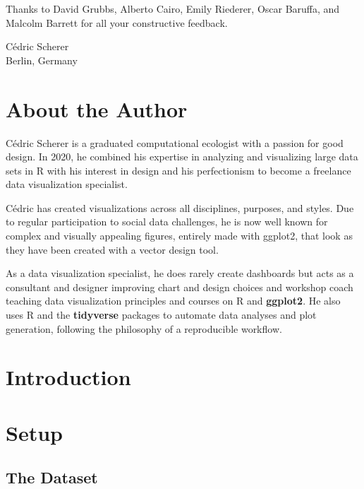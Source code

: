 \documentclass[
]{krantz}
\begin{document}
Thanks to David Grubbs, Alberto Cairo, Emily Riederer, Oscar Baruffa, and Malcolm Barrett for all your constructive feedback.

\begin{flushright}
Cédric Scherer\\
Berlin, Germany
\end{flushright}

\hypertarget{about-the-author}{%
\chapter*{About the Author}\label{about-the-author}}


Cédric Scherer is a graduated computational ecologist with a passion for good design. In 2020, he combined his expertise in analyzing and visualizing large data sets in R with his interest in design and his perfectionism to become a freelance data visualization specialist.

Cédric has created visualizations across all disciplines, purposes, and styles. Due to regular participation to social data challenges, he is now well known for complex and visually appealing figures, entirely made with ggplot2, that look as they have been created with a vector design tool.

As a data visualization specialist, he does rarely create dashboards but acts as a consultant and designer improving chart and design choices and workshop coach teaching data visualization principles and courses on R and \textbf{ggplot2}. He also uses R and the \textbf{tidyverse} packages to automate data analyses and plot generation, following the philosophy of a reproducible workflow.

\mainmatter

\hypertarget{introduction}{%
\chapter{Introduction}\label{introduction}}

\hypertarget{setup}{%
\chapter{Setup}\label{setup}}

\hypertarget{data}{%
\section{The Dataset}\label{data}}
\end{document}
